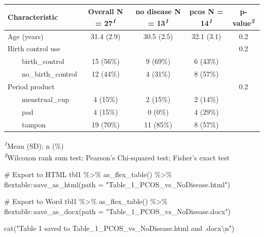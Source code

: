 \documentclass[
  letterpaper,
  DIV=11,
  numbers=noendperiod]{scrartcl}
\newenvironment{Shaded}{\begin{snugshade}}{\end{snugshade}}
\newcommand{\AttributeTok}[1]{\textcolor[rgb]{0.40,0.45,0.13}{#1}}
\newcommand{\CommentTok}[1]{\textcolor[rgb]{0.37,0.37,0.37}{#1}}
\newcommand{\FunctionTok}[1]{\textcolor[rgb]{0.28,0.35,0.67}{#1}}
\newcommand{\NormalTok}[1]{\textcolor[rgb]{0.00,0.23,0.31}{#1}}
\newcommand{\SpecialCharTok}[1]{\textcolor[rgb]{0.37,0.37,0.37}{#1}}
\newcommand{\StringTok}[1]{\textcolor[rgb]{0.13,0.47,0.30}{#1}}
\begin{document}
\begin{table}
\fontsize{12.0pt}{14.0pt}\selectfont
\begin{tabular*}{\linewidth}{@{\extracolsep{\fill}}lcccc}
\toprule
\textbf{Characteristic} & \textbf{Overall}  N = 27\textsuperscript{\textit{1}} & \textbf{no disease}  N = 13\textsuperscript{\textit{1}} & \textbf{pcos}  N = 14\textsuperscript{\textit{1}} & \textbf{p-value}\textsuperscript{\textit{2}} \\ 
\midrule\addlinespace[2.5pt]
Age (years) & 31.4 (2.9) & 30.5 (2.5) & 32.1 (3.1) & 0.2 \\ 
Birth control use &  &  &  & 0.2 \\ 
    birth\_control & 15 (56\%) & 9 (69\%) & 6 (43\%) &  \\ 
    no\_birth\_control & 12 (44\%) & 4 (31\%) & 8 (57\%) &  \\ 
Period product &  &  &  & 0.2 \\ 
    menstrual\_cup & 4 (15\%) & 2 (15\%) & 2 (14\%) &  \\ 
    pad & 4 (15\%) & 0 (0\%) & 4 (29\%) &  \\ 
    tampon & 19 (70\%) & 11 (85\%) & 8 (57\%) &  \\ 
\bottomrule
\end{tabular*}
\begin{minipage}{\linewidth}
\vspace{.05em}
\textsuperscript{\textit{1}}Mean (SD); n (\%)\\
\textsuperscript{\textit{2}}Wilcoxon rank sum test; Pearson's Chi-squared test; Fisher's exact test\\
\end{minipage}
\end{table}

\begin{Shaded}
\begin{Highlighting}[]
\CommentTok{\# Export to HTML}
\NormalTok{tbl1 }\SpecialCharTok{\%\textgreater{}\%}
  \FunctionTok{as\_flex\_table}\NormalTok{() }\SpecialCharTok{\%\textgreater{}\%}
\NormalTok{  flextable}\SpecialCharTok{::}\FunctionTok{save\_as\_html}\NormalTok{(}\AttributeTok{path =} \StringTok{"Table\_1\_PCOS\_vs\_NoDisease.html"}\NormalTok{)}

\CommentTok{\# Export to Word}
\NormalTok{tbl1 }\SpecialCharTok{\%\textgreater{}\%}
  \FunctionTok{as\_flex\_table}\NormalTok{() }\SpecialCharTok{\%\textgreater{}\%}
\NormalTok{  flextable}\SpecialCharTok{::}\FunctionTok{save\_as\_docx}\NormalTok{(}\AttributeTok{path =} \StringTok{"Table\_1\_PCOS\_vs\_NoDisease.docx"}\NormalTok{)}

\FunctionTok{cat}\NormalTok{(}\StringTok{"Table 1 saved to Table\_1\_PCOS\_vs\_NoDisease.html and .docx}\SpecialCharTok{\textbackslash{}n}\StringTok{"}\NormalTok{)}
\end{Highlighting}
\end{Shaded}
\end{document}

